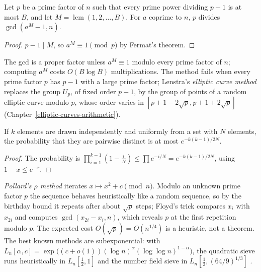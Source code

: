 \begin{proposition}\label{cryptography:proposition-pollard}
Let $p$ be a prime factor of $n$ such that every prime power dividing $p - 1$ is at most $B$, and let $M = \operatorname{lcm}(1, 2, \dots, B)$. For $a$ coprime to $n$, $p$ divides $\gcd(a^M - 1, n)$.
\end{proposition}

\begin{proof}
$p - 1 \mid M$, so $a^M \equiv 1 \pmod p$ by Fermat's theorem.
\end{proof}

The gcd is a proper factor unless $a^M \equiv 1$ modulo every prime factor of $n$; computing $a^M$ costs $O(B\log B)$ multiplications. The method fails when every prime factor $p$ has $p - 1$ with a large prime
factor; Lenstra's \emph{elliptic curve method} replaces the group $U_p$, of fixed order $p - 1$, by the group of points of a random elliptic curve modulo $p$, whose order varies in $[p + 1 - 2\sqrt p, p + 1 + 2\sqrt p]$
(Chapter~\ref{elliptic-curves-arithmetic}).

\begin{lemma}\label{cryptography:lemma-birthday}
If $k$ elements are drawn independently and uniformly from a set with $N$ elements, the probability that they are pairwise distinct is at most $e^{-k(k-1)/2N}$.
\end{lemma}

\begin{proof}
The probability is $\prod_{i=1}^{k-1}(1 - \frac iN) \leq \prod e^{-i/N} = e^{-k(k-1)/2N}$, using $1 - x \leq e^{-x}$.
\end{proof}

\begin{remark}\label{cryptography:remark-pollard-rho}
\emph{Pollard's $\rho$ method} iterates $x \mapsto x^2 + c \pmod n$. Modulo an unknown prime factor $p$ the sequence behaves heuristically like a random sequence, so by the birthday bound it repeats after
about $\sqrt p$ steps; Floyd's trick compares $x_i$ with $x_{2i}$ and computes $\gcd(x_{2i} - x_i, n)$, which reveals $p$ at the first repetition modulo $p$. The expected cost $O(\sqrt p) = O(n^{1/4})$ is a
heuristic, not a theorem. The best known methods are subexponential: with $L_n[\alpha, c] = \exp\bigl((c + o(1))(\log n)^\alpha(\log\log n)^{1-\alpha}\bigr)$, the quadratic sieve runs heuristically in $L_n[\frac12, 1]$
and the number field sieve in $L_n[\frac13, (64/9)^{1/3}]$ \cite{crandall-pomerance}.
\end{remark}

